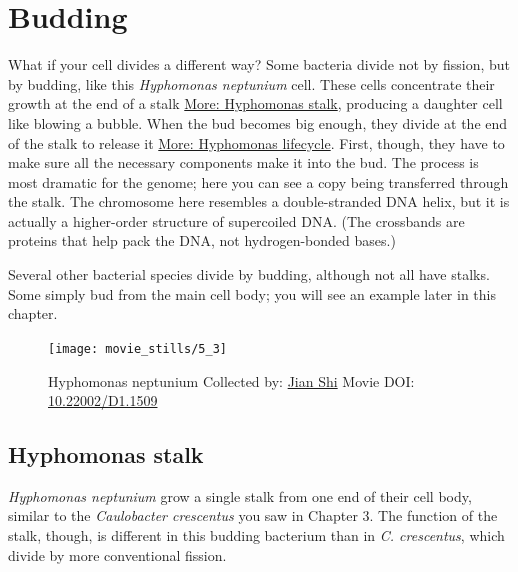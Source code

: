 \documentclass[]{tufte-book}
\begin{document}
\section{Budding}\label{budding}

What if your cell divides a different way? Some bacteria divide not by
fission, but by budding, like this \emph{Hyphomonas neptunium} cell.
These cells concentrate their growth at the end of a stalk
\protect\hyperlink{Hyphomonas_stalk}{More: Hyphomonas stalk}, producing
a daughter cell like blowing a bubble. When the bud becomes big enough,
they divide at the end of the stalk to release it
\protect\hyperlink{Hyphomonas_lifecycle}{More: Hyphomonas lifecycle}.
First, though, they have to make sure all the necessary components make
it into the bud. The process is most dramatic for the genome; here you
can see a copy being transferred through the stalk. The chromosome here
resembles a double-stranded DNA helix, but it is actually a higher-order
structure of supercoiled DNA. (The crossbands are proteins that help
pack the DNA, not hydrogen-bonded bases.)

Several other bacterial species divide by budding, although not all have
stalks. Some simply bud from the main cell body; you will see an example
later in this chapter.





\begin{figure}
\texttt{[image: movie\_stills/5\_3]} \caption[Hyphomonas neptunium Collected by:
\protect\hyperlink{jian_shi}{Jian Shi} Movie DOI:
\href{https://doi.org/10.22002/D1.1509}{10.22002/D1.1509}]{Hyphomonas neptunium Collected by:
\protect\hyperlink{jian_shi}{Jian Shi} Movie DOI:
\href{https://doi.org/10.22002/D1.1509}{10.22002/D1.1509}}\label{fig:5-3}
\end{figure}

\hypertarget{Hyphomonas_stalk}{\subsection{Hyphomonas
stalk}\label{Hyphomonas_stalk}}

\emph{Hyphomonas neptunium} grow a single stalk from one end of their
cell body, similar to the \emph{Caulobacter crescentus} you saw in
Chapter 3. The function of the stalk, though, is different in this
budding bacterium than in \emph{C. crescentus}, which divide by more
conventional fission.
\end{document}
